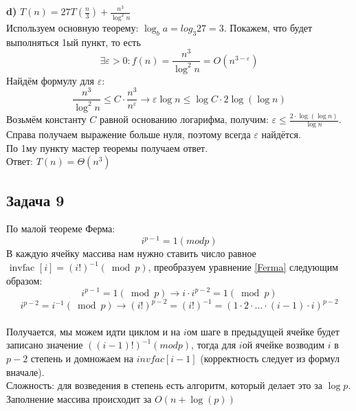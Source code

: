 \documentclass[a4paper,12pt]{article} %
\begin{document}
{\bf d)} $T(n) = 27T(\frac{n}{3})+\frac{n^3}{\log^2 n} $\\
Используем основную теорему: $ \log_b a= log_3 27 = 3 $. Покажем, что будет выполняться 1ый пункт, то есть 
$$
\exists \varepsilon>0: f(n)=\frac{n^{3}}{\log ^{2} n}=O\left(n^{3-\varepsilon}\right)
$$
Найдём формулу для $ \varepsilon $:
$$
\frac{n^{3}}{\log ^{2} n} \leq C \cdot \frac{n^{3}}{n^{\varepsilon}} \rightarrow \varepsilon \log n \leq \log C \cdot 2 \log (\log n)
$$
Возьмём константу $ C $ равной основанию логарифма, получим: $ \varepsilon \leqslant \frac{2 \cdot \log (\log n)}{\log n} $. Справа получаем выражение больше нуля, поэтому всегда $ \varepsilon $ найдётся.\\
По 1му пункту мастер теоремы получаем ответ.\\
Ответ: $T(n) =\Theta(n^3)$\\


\subsection*{Задача 9}
По малой теореме Ферма: 
\begin{equation} \label{Ferma}
i^{p-1} = 1 (mod p)
\end{equation}
В каждую ячейку массива нам нужно ставить число равное 
$ \text { invfac }[i]=(i !)^{-1}(\bmod p) $, преобразуем уравнение \eqref{Ferma} следующим образом:
$$
i^{p-1}=1(\bmod p) \rightarrow i \cdot i^{p-2}=1(\bmod p)
$$
$$
i^{p-2}=i^{-1}(\bmod p) \rightarrow(i !)^{p-2}=(i !)^{-1}=(1 \cdot 2 \cdot \dots \cdot(i-1) \cdot i)^{p-2}
$$\\
Получается, мы можем идти циклом и на $ i $ом шаге в предыдущей ячейке будет записано значение $ ((i - 1)!)^{-1} (mod p)  $, тогда для $i $ой ячейке возводим $ i $ в $ p-2 $ степень и домножаем на $ invfac[i - 1] $ (корректность следует из формул вначале).\\

Сложность: для возведения в степень есть алгоритм, который делает это за $ \log p $. Заполнение массива происходит за $ O(n+\log(p)) $
\end{document}
